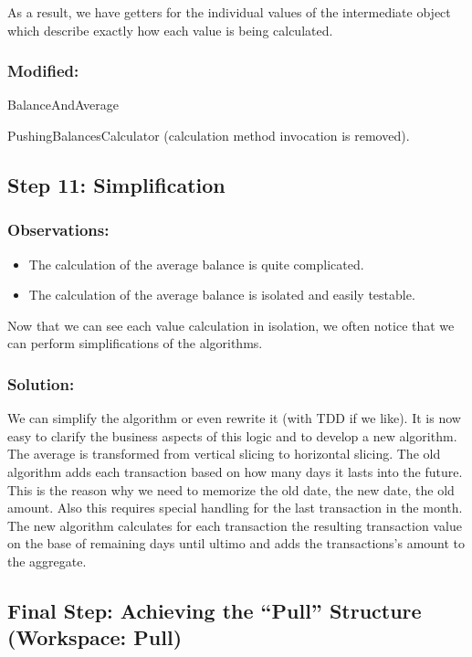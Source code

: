 \documentclass[a4paper,fleqn,titlepage,11pt]{article}
\begin{document}
As a result, we have getters for the individual values of the intermediate object which describe exactly how each value is being calculated.

\subsubsection*{Modified:}

BalanceAndAverage

PushingBalancesCalculator (calculation method invocation is removed).

\subsection*{Step 11: Simplification}

\subsubsection*{Observations:}
\begin{itemize}
\item The calculation of the average balance is quite complicated.
\item The calculation of the average balance is isolated and easily testable.
\end{itemize}

Now that we can see each value calculation in isolation, we often notice that we can perform simplifications of the algorithms. 

\subsubsection*{Solution:}

We can simplify the algorithm or even rewrite it (with TDD if we like). It is now easy to clarify the business aspects of this logic and to develop a new algorithm. The average is transformed from vertical slicing to horizontal slicing. The old algorithm adds each transaction based on how many days it lasts into the future. This is the reason why we need to memorize the old date, the new date, the old amount. Also this requires special handling for the last transaction in the month. The new algorithm calculates for each transaction the resulting transaction value on the base of remaining days until ultimo and adds the transactions's amount to the aggregate.

\subsection*{Final Step: Achieving the ``Pull'' Structure (Workspace: Pull)}
\end{document}
